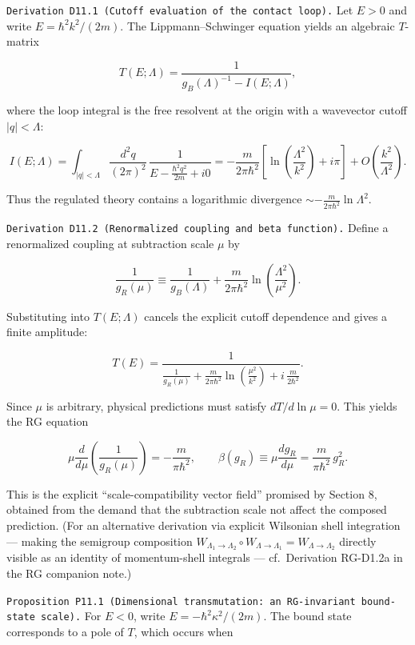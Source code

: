 \documentclass[
]{article}
\begin{document}
\texttt{Derivation\ D11.1\ (Cutoff\ evaluation\ of\ the\ contact\ loop).}
Let \(E>0\) and write \(E=\hbar^2 k^2/(2m)\). The Lippmann--Schwinger
equation yields an algebraic \(T\)-matrix

\[
T(E;\Lambda)
=
\frac{1}{g_B(\Lambda)^{-1}-I(E;\Lambda)},
\]

where the loop integral is the free resolvent at the origin with a
wavevector cutoff \(|q|<\Lambda\):

\[
I(E;\Lambda)
=
\int_{|q|<\Lambda}\frac{d^2q}{(2\pi)^2}\,
\frac{1}{E-\frac{\hbar^2 q^2}{2m}+i0}
=
-\frac{m}{2\pi\hbar^2}\left[\ln\!\left(\frac{\Lambda^2}{k^2}\right)+i\pi\right]
+O\!\left(\frac{k^2}{\Lambda^2}\right).
\]

Thus the regulated theory contains a logarithmic divergence
\(\sim -\frac{m}{2\pi\hbar^2}\ln\Lambda^2\).

\texttt{Derivation\ D11.2\ (Renormalized\ coupling\ and\ beta\ function).}
Define a renormalized coupling at subtraction scale \(\mu\) by

\[
\frac{1}{g_R(\mu)}
\equiv
\frac{1}{g_B(\Lambda)}
+\frac{m}{2\pi\hbar^2}\ln\!\left(\frac{\Lambda^2}{\mu^2}\right).
\]

Substituting into \(T(E;\Lambda)\) cancels the explicit cutoff
dependence and gives a finite amplitude:

\[
T(E)
=
\frac{1}{
\frac{1}{g_R(\mu)}
+\frac{m}{2\pi\hbar^2}\ln\!\left(\frac{\mu^2}{k^2}\right)
+ i\,\frac{m}{2\hbar^2}
}.
\]

Since \(\mu\) is arbitrary, physical predictions must satisfy
\(dT/d\ln\mu=0\). This yields the RG equation

\[
\mu\frac{d}{d\mu}\left(\frac{1}{g_R(\mu)}\right)
=-\frac{m}{\pi\hbar^2},
\qquad
\beta(g_R)\equiv \mu\frac{d g_R}{d\mu}
=\frac{m}{\pi\hbar^2}\,g_R^2.
\]

This is the explicit ``scale-compatibility vector field'' promised by
Section 8, obtained from the demand that the subtraction scale not
affect the composed prediction. (For an alternative derivation via
explicit Wilsonian shell integration --- making the semigroup
composition
\(W_{\Lambda_1\to\Lambda_2}\circ W_{\Lambda\to\Lambda_1} = W_{\Lambda\to\Lambda_2}\)
directly visible as an identity of momentum-shell integrals ---
cf.~Derivation RG-D1.2a in the RG companion note.)

\texttt{Proposition\ P11.1\ (Dimensional\ transmutation:\ an\ RG-invariant\ bound-state\ scale).}
For \(E<0\), write \(E=-\hbar^2\kappa^2/(2m)\). The bound state
corresponds to a pole of \(T\), which occurs when
\end{document}
